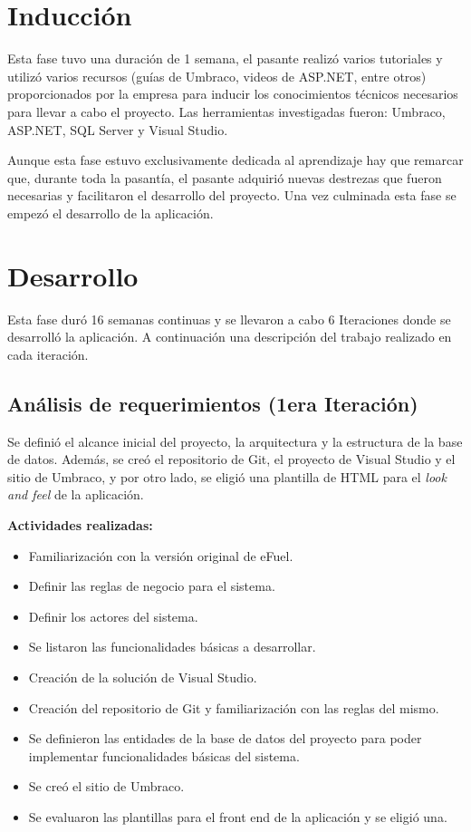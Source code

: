 \section{Inducción}
Esta fase tuvo una duración de 1 semana, el pasante realizó varios tutoriales y utilizó varios recursos (guías de Umbraco, videos de ASP.NET, entre otros) proporcionados por la empresa para inducir los conocimientos técnicos necesarios para llevar a cabo el proyecto. Las herramientas investigadas fueron: Umbraco, ASP.NET, SQL Server y Visual Studio.

Aunque esta fase estuvo exclusivamente dedicada al aprendizaje hay que remarcar que, durante toda la pasantía, el pasante adquirió nuevas destrezas que fueron necesarias y facilitaron el desarrollo del proyecto. Una vez culminada esta fase se empezó el desarrollo de la aplicación.


\section{Desarrollo}
Esta fase duró 16 semanas continuas y se llevaron a cabo 6 Iteraciones donde se desarrolló la aplicación. A continuación una descripción del trabajo realizado en cada iteración.

\subsection{Análisis de requerimientos (1era Iteración)}
Se definió el alcance inicial del proyecto, la arquitectura y la estructura de la base de datos. Además, se creó el repositorio de Git, el proyecto de Visual Studio y el sitio de Umbraco, y por otro lado, se eligió una plantilla de HTML para el \emph{look and feel} de la aplicación.

\textbf{Actividades realizadas:}
\begin{itemize}
    \item Familiarización con la versión original de eFuel.
    \item Definir las reglas de negocio para el sistema.
    \item Definir los actores del sistema.
    \item Se listaron las funcionalidades básicas a desarrollar.
    \item Creación de la solución de Visual Studio.
    \item Creación del repositorio de Git y familiarización con las reglas del mismo.
    \item Se definieron las entidades de la base de datos del proyecto para poder implementar funcionalidades básicas del sistema.
    \item Se creó el sitio de Umbraco.
    \item Se evaluaron las plantillas para el front end de la aplicación y se eligió una.
\end{itemize}

